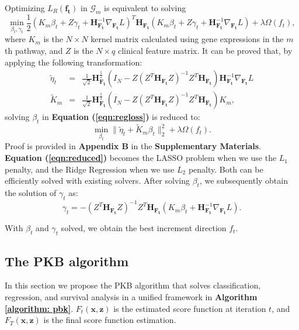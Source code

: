 \documentclass[a4paper,12pt]{article}
\newcommand{\bd}[1]{\mathbf{#1}}
\newcommand{\grad}[2]{\nabla_{\bd{#2}} #1}
\newcommand{\hess}[1]{\bd{H}_{\bd{#1}}}
\begin{document}
Optimizing $L_R(\bd{f_t})$ in $\mathcal{G}_m$ is equivalent to solving
\begin{equation}
\label{eqn:regloss}
\min_{\beta_t, \gamma_t} \frac{1}{2} (K_m \beta_t + Z \gamma_t + \hess{F_t}^{-1} \grad{L}{F_t})^T \hess{F_t} (K_m \beta_t + Z \gamma_t + \hess{F_t}^{-1} \grad{L}{F_t}) + \lambda \Omega({f_t}),
\end{equation}
where $K_m$ is the $N \times N$ kernel matrix calculated using gene expressions in the $m$th pathway, and $Z$ is the $N \times q$ clinical feature matrix. It can be proved that, by applying the following transformation:
\begin{eqnarray*}
	\tilde{\eta}_t &=& \frac{1}{\sqrt{2}}\hess{F_t}^{\frac{1}{2}}(I_N - Z(Z^T \hess{F_t} Z)^{-1}Z^T \hess{F_t})\hess{F_t}^{-1}\grad{L}{F_t}\\
	\tilde{K}_m &=& \frac{1}{\sqrt{2}}\hess{F_t}^{\frac{1}{2}}(I_N - Z(Z^T\hess{F_t}Z)^{-1}Z^T\hess{F_t})K_m,
\end{eqnarray*}
solving $\beta_t$ in \textbf{Equation (\ref{eqn:regloss})} is reduced to:
\begin{equation}
\label{eqn:reduced}
\min_{\beta_t} \|\tilde{\eta}_t + \tilde{K}_m \beta_t \|_2^2 + \lambda \Omega({f_t}).
\end{equation}
Proof is provided in \textbf{Appendix B} in the \textbf{Supplementary Materials}. \textbf{Equation (\ref{eqn:reduced})} becomes the LASSO problem when we use the $L_1$ penalty, and the Ridge Regression when we use $L_2$ penalty. Both can be efficiently solved with existing solvers. After solving $\beta_t$, we subsequently obtain the solution of $\gamma_t$ as:
$$\gamma_t = -(Z^T\hess{F_t}Z)^{-1}Z^T\hess{F_t}(K_m\beta_t + \hess{F_t}^{-1}\grad{L}{F_t}).$$

With $\beta_t$ and $\gamma_t$ solved, we obtain the best increment direction $f_t$.

\subsection{The PKB algorithm}
In this section we propose the PKB algorithm that solves classification, regression, and survival analysis in a unified framework in \textbf{Algorithm \ref{algorithm: pbk}}. $F_t(\bd{x}, \bd{z})$ is the estimated score function at iteration $t$, and $F_T(\bd{x}, \bd{z})$ is the final score function estimation.
\end{document}
